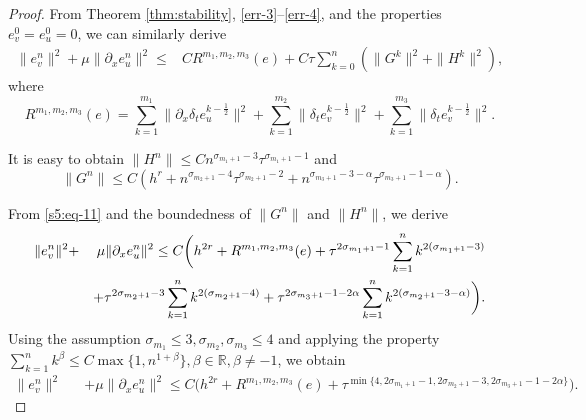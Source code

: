 \documentclass[10pt]{siamltex}
\newcommand{\px}[1][x]{\partial_{#1}}
\newcommand{\mfrac}[1][2]{\frac{1}{2}}
\begin{document}
\begin{proof}
From Theorem \ref{thm:stability}, \eqref{err-3}--\eqref{err-4}, and
the properties $e_v^0=e_u^0=0$, we can similarly derive
\begin{equation}\label{s5:eq-11}\begin{aligned}
\|e_v^{n}\|^2 +\mu\|\px[x]e_u^{n}\|^2\leq& C R^{m_1,m_2,m_3}(e)
+C\tau\sum_{k=0}^{n}\left(\|G^{k}\|^2+\|H^k\|^2\right),
\end{aligned}\end{equation}
where $$R^{m_1,m_2,m_3}(e)=\sum_{k=1}^{m_1} \|\px[x]\delta_te_u^{k-\mfrac}\|^2
+ \sum_{k=1}^{m_2} \|\delta_te_v^{k-\mfrac}\|^2+ \sum_{k=1}^{m_3} \|\delta_te_v^{k-\mfrac}\|^2.$$


It is easy to obtain $\|H^n\|\leq Cn^{\sigma_{m_1+1}-3}\tau^{\sigma_{m_1+1}-1}$ and
$$\|G^n\|\leq C\left(h^r
+n^{\sigma_{m_2+1}-4}\tau^{\sigma_{m_2+1}-2}
+n^{\sigma_{m_3+1}-3-\alpha}\tau^{\sigma_{m_3+1}-1-\alpha}\right).$$

From \eqref{s5:eq-11}  and the boundedness of $\|G^n\|$ and $\|H^n\|$,
we derive
\begin{eqnarray}\label{s5:eq-12}
\|e_v^{n}\|^2 &+&\mu\|\px[x]e_u^{n}\|^2\leq C\bigg(  h^{2r}
+R^{m_1,m_2,m_3}(e)+\tau^{2\sigma_{m_1+1}-1}\sum_{k=1}^{n}k^{2(\sigma_{m_1+1}-3)}\notag\\
&&+\tau^{2\sigma_{m_2+1}-3}\sum_{k=1}^{n}k^{2(\sigma_{m_2+1}-4)}
+\tau^{2\sigma_{m_3+1}-1-2\alpha}\sum_{k=1}^{n}k^{2(\sigma_{m_2+1}-3-\alpha)}\bigg).
 \end{eqnarray}
Using the assumption  $\sigma_{m_1}\leq 3,\sigma_{m_2},\sigma_{m_3}\leq4$ and
applying the property $\sum_{k=1}^nk^{\beta}\leq C\max\{1,n^{1+\beta}\},\beta\in \mathbb{R},\beta\neq-1$,
we obtain
\begin{eqnarray*}
\|e_v^{n}\|^2 &&+\mu\|\px[x]e_u^{n}\|^2
\leq C\Big(h^{2r}+R^{m_1,m_2,m_3}(e)
 +\tau^{\min\{4,2{\sigma_{m_1+1}-1},2\sigma_{m_2+1}-3,2\sigma_{m_3+1}-1-2\alpha\}}
\Big).\label{s5:eq-13}
\end{eqnarray*}


\end{proof}
\end{document}
